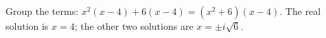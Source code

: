 Group the terms: $x^2(x-4)+6(x-4)=\left(x^2+6\right)(x-4)$. The real solution is $x=\boxed{4}$; the other two solutions are $x=\pm i\sqrt6$.

